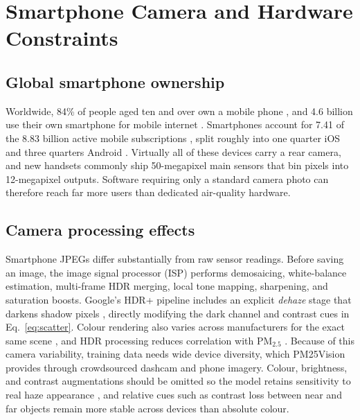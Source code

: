 \documentclass[conference]{IEEEtran}
\newcommand{\pmtwofive}{PM$_{2.5}$}
\begin{document}
\section{Smartphone Camera and Hardware Constraints}
\label{sec:mobile}

\subsection{Global smartphone ownership}

Worldwide, 84\% of people aged ten and over own a mobile phone
\cite{itu2026facts}, and 4.6 billion use their own smartphone for mobile
internet \cite{gsma2026somic}. Smartphones account for 7.41 of the 8.83 billion
active mobile subscriptions \cite{ericsson2025mobility}, split roughly into one
quarter iOS and three quarters Android \cite{counterpoint2026installed,
statcounter2026os}. Virtually all of these devices carry a rear camera, and new
handsets commonly ship 50-megapixel main sensors \cite{omdia2025cameras,
counterpoint2024camera} that bin pixels into 12-megapixel outputs. Software
requiring only a standard camera photo can therefore reach far more users than
dedicated air-quality hardware.

\subsection{Camera processing effects}

Smartphone JPEGs differ substantially from raw sensor readings. Before saving an
image, the image signal processor (ISP) performs demosaicing, white-balance
estimation, multi-frame HDR merging, local tone mapping, sharpening, and
saturation boosts. Google's HDR+ pipeline includes an explicit \emph{dehaze}
stage that darkens shadow pixels \cite{hasinoff2016hdrplus}, directly modifying
the dark channel and contrast cues in Eq.~\eqref{eq:scatter}. Colour rendering
also varies across manufacturers for the exact same scene
\cite{wang2023smartphonecolor}, and HDR processing reduces correlation with
\pmtwofive{} \cite{kambleMobileImageDrivenPM252025}. Because of this camera
variability, training data needs wide device diversity, which PM25Vision
provides through crowdsourced dashcam and phone imagery. Colour, brightness, and
contrast augmentations should be omitted so the model retains sensitivity to
real haze appearance \cite{bylerLocationGeneralizabilityImageBased2025}, and
relative cues such as contrast loss between near and far objects remain more
stable across devices than absolute colour.
\end{document}
